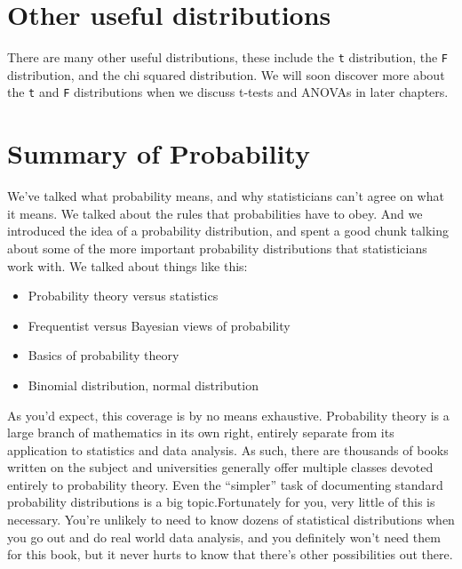 \documentclass[
  letterpaper,
  DIV=11,
  numbers=noendperiod]{scrreprt}
\begin{document}
\section{Other useful distributions}\label{other-useful-distributions}

There are many other useful distributions, these include the \texttt{t}
distribution, the \texttt{F} distribution, and the chi squared
distribution. We will soon discover more about the \texttt{t} and
\texttt{F} distributions when we discuss t-tests and ANOVAs in later
chapters.

\section{Summary of Probability}\label{summary-of-probability}

We've talked what probability means, and why statisticians can't agree
on what it means. We talked about the rules that probabilities have to
obey. And we introduced the idea of a probability distribution, and
spent a good chunk talking about some of the more important probability
distributions that statisticians work with. We talked about things like
this:

\begin{itemize}
\item
  Probability theory versus statistics
\item
  Frequentist versus Bayesian views of probability
\item
  Basics of probability theory
\item
  Binomial distribution, normal distribution
\end{itemize}

As you'd expect, this coverage is by no means exhaustive. Probability
theory is a large branch of mathematics in its own right, entirely
separate from its application to statistics and data analysis. As such,
there are thousands of books written on the subject and universities
generally offer multiple classes devoted entirely to probability theory.
Even the ``simpler'' task of documenting standard probability
distributions is a big topic.Fortunately for you, very little of this is
necessary. You're unlikely to need to know dozens of statistical
distributions when you go out and do real world data analysis, and you
definitely won't need them for this book, but it never hurts to know
that there's other possibilities out there.
\end{document}
